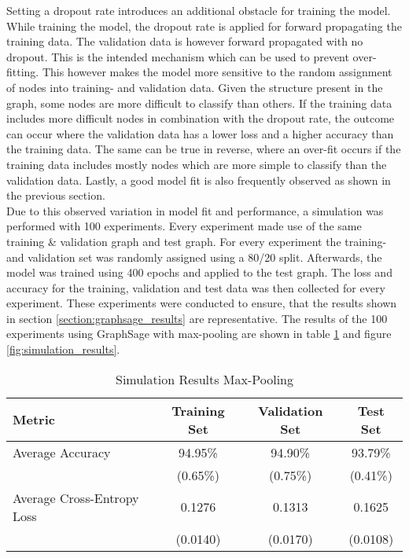   \noindent Setting a dropout rate introduces an additional obstacle
  for training the model. While training the model, the dropout rate is
  applied for forward propagating the training data. The validation data is 
  however forward propagated with no dropout. This is the intended mechanism
  which can be used to prevent over-fitting. This however makes the model more
  sensitive to the random assignment of nodes into training- and validation
  data. Given the structure present in the graph, some nodes are more difficult
  to classify than others. If the training data includes more difficult nodes
  in combination with the dropout rate, the outcome can occur where the
  validation data has a lower loss and a higher accuracy than the training
  data. The same can be true in reverse, where an over-fit occurs if the
  training data includes mostly nodes which are more simple to classify than
  the validation data. Lastly, a good model fit is also frequently observed as
  shown in the previous section. \\

  \noindent Due to this observed variation in model fit and performance, a
  simulation was performed with 100 experiments. Every experiment made use of
  the same training \& validation graph and test graph. For every experiment
  the training- and validation set was randomly assigned using a 80/20 split.
  Afterwards, the model was trained using 400 epochs and applied to the
  test graph. The loss and accuracy for the training, validation and test data
  was then collected for every experiment. These experiments were conducted to
  ensure, that the results shown in section \ref{section:graphsage_results} are
  representative. The results of the 100 experiments using GraphSage with
  max-pooling are shown in table \ref{table:simulation_results} and figure 
  \ref{fig:simulation_results}. 

  \begin{table}[h]
    \centering
      \begin{tabular}{|l||c|c|c|}
      \hline
      \textbf{Metric} & \textbf{Training Set} & \textbf{Validation Set} & 
      \textbf{Test Set}\\
      \hline\hline
      Average Accuracy & 94.95\% & 94.90\% & 93.79\% \\\hline 
                       & (0.65\%) & (0.75\%) & (0.41\%) \\\hline
      Average Cross-Entropy Loss & 0.1276 & 0.1313 & 0.1625 \\\hline
                                 & (0.0140) & (0.0170) & (0.0108) \\
      \hline
    \end{tabular}
    \caption{Simulation Results Max-Pooling}
    \label{table:simulation_results}
  \end{table}

